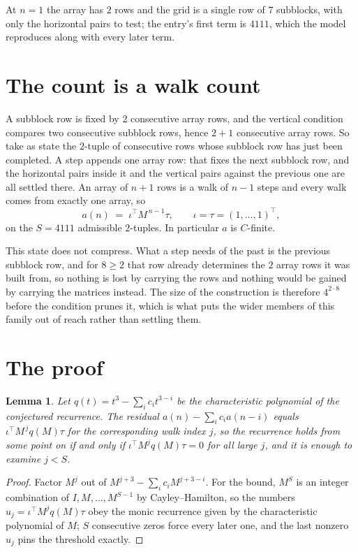 \documentclass[11pt,a4paper]{article}
\theoremstyle{plain}
\newtheorem{lemma}[theorem]{Lemma}
\theoremstyle{definition}
\begin{document}
At $n=1$ the array has $2$ rows and the grid is a single row of $7$
subblocks, with only the horizontal pairs to test; the entry's first term is
$4111$, which the model reproduces along with every later term.

\section{The count is a walk count}

A subblock row is fixed by $2$ consecutive array rows, and the vertical condition compares
two consecutive subblock rows, hence $2+1$ consecutive array rows. So take as state the
$2$-tuple of consecutive rows whose subblock row has just been completed. A step appends one
array row: that fixes the next subblock row, and the horizontal pairs inside it and the
vertical pairs against the previous one are all settled there. An array of $n+1$ rows is
a walk of $n-1$ steps and every walk comes from exactly one array, so
\[
a(n)\;=\;\iota^{\!\top}M^{\,n-1}\tau,\qquad\iota=\tau=(1,\dots,1)^{\!\top},
\]
on the $S=4111$ admissible $2$-tuples. In particular $a$ is $C$-finite.

This state does not compress. What a step needs of the past is the previous subblock row, and
for $8\ge2$ that row already determines the $2$ array rows it was built from, so nothing
is lost by carrying the rows and nothing would be gained by carrying the matrices instead. The
size of the construction is therefore $4^{2\cdot8}$ before the condition prunes
it, which is what puts the wider members of this family out of reach rather than settling them.

\section{The proof}

\begin{lemma}\label{lem:crit}
Let $q(t)=t^{3}-\sum_i c_it^{3-i}$ be the characteristic polynomial of the
conjectured recurrence. The residual $a(n)-\sum_ic_ia(n-i)$ equals
$\iota^{\!\top}M^{\,j}q(M)\tau$ for the corresponding walk index $j$, so the recurrence
holds from some point on if and only if $\iota^{\!\top}M^{j}q(M)\tau=0$ for all large $j$,
and it is enough to examine $j<S$.
\end{lemma}

\begin{proof}
Factor $M^{j}$ out of $M^{j+3}-\sum_ic_iM^{j+3-i}$. For the bound, $M^{S}$
is an integer combination of $I,M,\dots,M^{S-1}$ by Cayley--Hamilton, so the numbers
$u_j=\iota^{\!\top}M^{j}q(M)\tau$ obey the monic recurrence given by the characteristic
polynomial of $M$; $S$ consecutive zeros force every later one, and the last nonzero $u_j$
pins the threshold exactly.
\end{proof}
\end{document}
